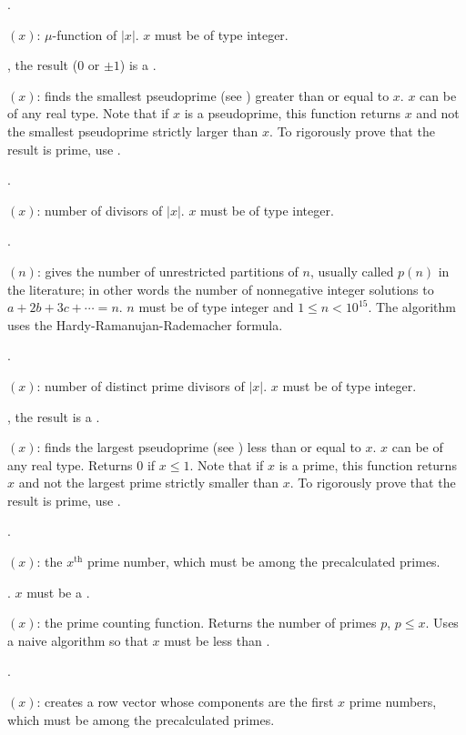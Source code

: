 .

$(x)$:  $\mu$-function of $|x|$. $x$ must
be of type integer.

, the result ($0$ or $\pm 1$) is a .

$(x)$: finds the smallest pseudoprime (see
) greater than or equal to $x$. $x$ can be of any real
type. Note that if $x$ is a pseudoprime, this function returns $x$ and not
the smallest pseudoprime strictly larger than $x$. To rigorously prove that
the result is prime, use .

.

$(x)$: number of divisors of $|x|$. $x$ must be of type
integer.

.

$(n)$: gives the number of unrestricted partitions of
$n$, usually called $p(n)$ in the literature; in other words the number of
nonnegative integer solutions to $a+2b+3c+\cdots=n$. $n$ must be of type
integer and $1\le n<10^{15}$. The algorithm uses the
Hardy-Ramanujan-Rademacher formula.

.

$(x)$: number of distinct prime divisors of $|x|$. $x$
must be of type integer.

, the result is a .

$(x)$: finds the largest pseudoprime (see
) less than or equal to $x$. $x$ can be of any real type.
Returns 0 if $x\le1$. Note that if $x$ is a prime, this function returns $x$
and not the largest prime strictly smaller than $x$. To rigorously prove that
the result is prime, use .

.

$(x)$: the $x^{\text{th}}$ prime number, which must be among
the precalculated primes.

. $x$ must be a .

$(x)$: the prime counting function. Returns the number of
primes $p$, $p \leq x$. Uses a naive algorithm so that $x$ must be less than
.

.

$(x)$: creates a row vector whose components
are the first $x$ prime numbers, which must be among the precalculated primes.

